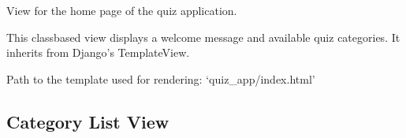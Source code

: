\documentclass[letterpaper,10pt,english]{sphinxmanual}
\begin{document}
\begin{fulllineitems}
\label{\detokenize{views:IndexView}}
\pysigstartsignatures
\pysigline
{}
\pysigstopsignatures
\sphinxAtStartPar
View for the home page of the quiz application.

\sphinxAtStartPar
This class\sphinxhyphen{}based view displays a welcome message and available quiz categories.
It inherits from Django’s TemplateView.

\begin{fulllineitems}
\label{\detokenize{views:IndexView.template_name}}
\pysigstartsignatures
\pysigline
{}
\pysigstopsignatures
\sphinxAtStartPar
Path to the template used for rendering: ‘quiz\_app/index.html’

\end{fulllineitems}


\end{fulllineitems}



\subsection{Category List View}
\label{\detokenize{views:category-list-view}}
\end{document}
